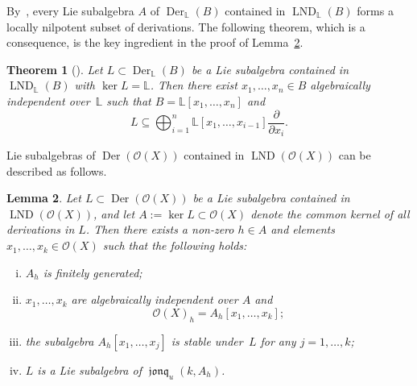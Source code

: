 \documentclass[12pt,a4paper]{amsart}
\theoremstyle{plain}
\newtheorem{theorem}{Theorem}[section]
\newtheorem{lemma}[theorem]{Lemma}
\theoremstyle{definition}
\theoremstyle{remark}
\def\Der{\operatorname{Der}}
\def\LND{\operatorname{LND}}
\def\cO{{\mathcal O}}
\DeclareMathOperator{\jonq}{\mathfrak{jonq}}
\begin{document}
By~\cite[Proposition]{Skutin}, every Lie subalgebra $A$ of $\Der_\mathbb{L}(B)$ contained in $\LND_\mathbb{L}(B)$ forms a locally nilpotent subset of derivations. 
The following theorem, which is a consequence, is the key ingredient in the proof of Lemma~\ref{lm:L-structure}.

\begin{theorem}[{\cite[Theorem 6]{Skutin}}]\label{th:Skutin}
   Let $L\subset \Der_\mathbb{L}(B)$ be a Lie subalgebra contained in $\LND_\mathbb{L}(B)$ with $\ker L = \mathbb{L}$. Then there exist $x_1,\ldots,x_n\in B$ algebraically independent over~$\mathbb{L}$ such that $B = \mathbb{L}[x_1, \ldots, x_n]$ and 
   \[L \subseteq \bigoplus_{i=1}^n \mathbb{L}[x_1, \ldots , x_{i-1}]\frac{\partial}{\partial x_i}.\]
\end{theorem}

Lie subalgebras of $\Der(\cO(X))$ contained in $\LND(\cO(X))$ can be described as follows.

\begin{lemma}\label{lm:L-structure}
Let $L \subset \Der( \cO(X))$ be a Lie subalgebra contained in $\LND( \cO(X))$,
and let $A:=\ker L\subset\cO(X)$ denote the common kernel of all derivations in $L$. 
Then there exists a non-zero $h \in A$ and elements $x_1,\dots, x_k \in \cO(X)$ such that the following holds:
\begin{enumerate}[(i)]
    \item $A_h$ is finitely generated;
    \item $x_1,\ldots,x_k$ are algebraically independent over $A$ and
          \[  \cO(X)_h = A_h[x_1,\ldots,x_k];\]
    \item the subalgebra $A_h[x_1,\ldots,x_j]$ is stable under~$L$ for any $j=1,\ldots,k$;
    \item $L$ is a Lie subalgebra of $\jonq_u(k,A_h)$.
\end{enumerate}
\end{lemma}
\end{document}
